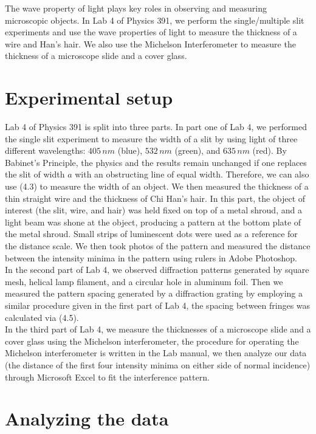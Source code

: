 \documentclass[11pt]{book}
\theoremstyle{break}
\theoremstyle{break}
\begin{document}
The wave property of light plays key roles in observing and measuring microscopic objects. In Lab 4 of Physics 391, we perform the single/multiple slit experiments and use the wave properties of light to measure the thickness of a wire and Han's hair. We also use the Michelson Interferometer to measure the thickness of a microscope slide and a cover glass.

\hfill\break
\hfill\break
\section{Experimental setup}
Lab 4 of Physics 391 is split into three parts. In part one of Lab 4, we performed the single slit experiment to measure the width of a slit by using light of three different wavelengths: $405\, nm$ (blue), $532\, nm$ (green), and $635\, nm$ (red). By Babinet's Principle, the physics and the results remain unchanged if one replaces the slit of width $a$ with an obstructing line of equal width. Therefore, we can also use (4.3) to measure the width of an object. We then measured the thickness of a thin straight wire and the thickness of Chi Han's hair. In this part, the object of interest (the slit, wire, and hair) was held fixed on top of a metal shroud, and a light beam was shone at the object, producing a pattern at the bottom plate of the metal shroud. Small strips of luminescent dots were used as a reference for the distance scale. We then took photos of the pattern and measured the distance between the intensity minima in the pattern using rulers in Adobe Photoshop. \\

In the second part of Lab 4, we observed diffraction patterns generated by square mesh, helical lamp filament, and a circular hole in aluminum foil. Then we measured the pattern spacing generated by a diffraction grating by employing a similar procedure given in the first part of Lab 4, the spacing between fringes was calculated via (4.5).\\

In the third part of Lab 4, we measure the thicknesses of a microscope slide and a cover glass using the Michelson interferometer, the procedure for operating the Michelson interferometer is written in the Lab manual, we then analyze our data (the distance of the first four intensity minima on either side of normal incidence) through Microsoft Excel to fit the interference pattern. 
 

\section{Analyzing the data}
\end{document}
